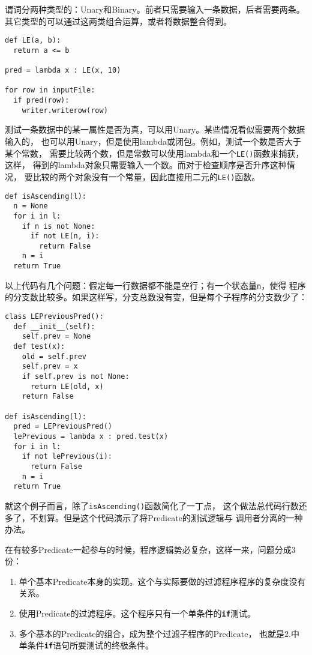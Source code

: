 \documentclass[11pt]{article}
\newcommand{\id}[1]{\texttt{#1}}
\newcommand{\kw}[1]{\texttt{\textbf{#1}}}
\begin{document}
谓词分两种类型的：Unary和Binary。前者只需要输入一条数据，后者需要两条。
其它类型的可以通过这两类组合运算，或者将数据整合得到。
\begin{lstlisting}
def LE(a, b):
  return a <= b

pred = lambda x : LE(x, 10)

for row in inputFile:
  if pred(row):
    writer.writerow(row)
\end{lstlisting}

测试一条数据中的某一属性是否为真，可以用Unary。某些情况看似需要两个数据输入的，
也可以用Unary，但是使用lambda或闭包。例如，测试一个数是否大于某个常数，
需要比较两个数，但是常数可以使用lambda和一个\id{LE()}函数来捕获，这样，
得到的lambda对象只需要输入一个数。而对于检查顺序是否升序这种情况，
要比较的两个对象没有一个常量，因此直接用二元的\id{LE()}函数。
\begin{lstlisting}
def isAscending(l):
  n = None
  for i in l:
    if n is not None:
      if not LE(n, i):
        return False
    n = i
  return True    
\end{lstlisting}

以上代码有几个问题：假定每一行数据都不能是空行；有一个状态量\id{n}，使得
程序的分支数比较多。如果这样写，分支总数没有变，但是每个子程序的分支数少了：
\begin{lstlisting}
class LEPreviousPred():
  def __init__(self):
    self.prev = None
  def test(x):
    old = self.prev
    self.prev = x
    if self.prev is not None:
      return LE(old, x)
    return False
      
def isAscending(l):
  pred = LEPreviousPred()
  lePrevious = lambda x : pred.test(x)
  for i in l:
    if not lePrevious(i):
      return False
    n = i
  return True    
\end{lstlisting}

就这个例子而言，除了\id{isAscending()}函数简化了一丁点，
这个做法总代码行数还多了，不划算。但是这个代码演示了将Predicate的测试逻辑与
调用者分离的一种办法。

在有较多Predicate一起参与的时候，程序逻辑势必复杂，这样一来，问题分成3份：

\begin{enumerate}
  \item 单个基本Predicate本身的实现。这个与实际要做的过滤程序程序的复杂度没有关系。
  \item 使用Predicate的过滤程序。这个程序只有一个单条件的\kw{if}测试。
  \item 多个基本的Predicate的组合，成为整个过滤子程序的Predicate，
  也就是2.中单条件\kw{if}语句所要测试的终极条件。
\end{enumerate}
\end{document}
